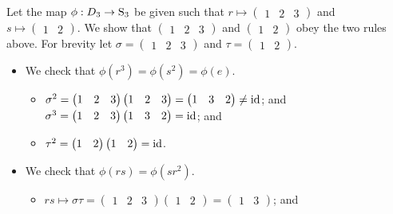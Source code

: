 \begin{enumerate}
    Let the map $\phi: D_3 \to \mathrm{S}_{3}$ be given such that $r \mapsto \begin{pmatrix}1 & 2 & 3\end{pmatrix}$ and $s \mapsto \begin{pmatrix}1 & 2\end{pmatrix}$. We show that $\begin{pmatrix}1 & 2 & 3\end{pmatrix}$ and $\begin{pmatrix}1 & 2\end{pmatrix}$ obey the two rules above. For brevity let $\sigma = \begin{pmatrix}1 & 2 & 3\end{pmatrix}$ and $\tau = \begin{pmatrix}1 & 2\end{pmatrix}$.
    \begin{itemize}
        \item We check that $\phi(r^3) = \phi(s^2) = \phi(e)$.
        \begin{itemize}
            \item $\sigma^2 = \begin{pmatrix}1 & 2 & 3\end{pmatrix}\begin{pmatrix}1 & 2 & 3\end{pmatrix} = \begin{pmatrix}1 & 3 & 2\end{pmatrix} \neq \mathrm{id}$; and $\sigma^3 = \begin{pmatrix}1 & 2 & 3\end{pmatrix}\begin{pmatrix}1 & 3 & 2\end{pmatrix} = \mathrm{id}$; and
            \item $\tau^2 = \begin{pmatrix}1 & 2\end{pmatrix}\begin{pmatrix}1 & 2\end{pmatrix} = \mathrm{id}$.
        \end{itemize}
        \item We check that $\phi(rs) = \phi(sr^2)$.
        \begin{itemize}
            \item $rs \mapsto \sigma\tau = \begin{pmatrix}1 & 2 & 3\end{pmatrix}\begin{pmatrix}1 & 2\end{pmatrix} = \begin{pmatrix}1 & 3\end{pmatrix}$; and

\end{itemize}
\end{itemize}
\end{enumerate}
